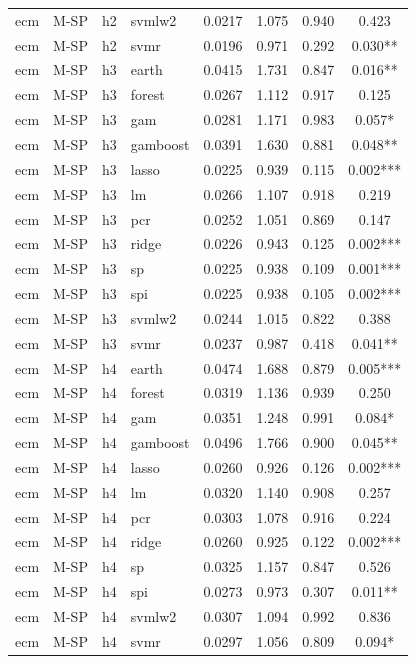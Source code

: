 \begin{ThreePartTable}
\begin{longtable}[t]{llclcccc}
ecm & M-SP & h2 & svmlw2 & 0.0217 & 1.075 & 0.940 & 0.423\\
ecm & M-SP & h2 & svmr & 0.0196 & 0.971 & 0.292 & 0.030**\\
\addlinespace
ecm & M-SP & h3 & earth & 0.0415 & 1.731 & 0.847 & 0.016**\\
ecm & M-SP & h3 & forest & 0.0267 & 1.112 & 0.917 & 0.125\\
ecm & M-SP & h3 & gam & 0.0281 & 1.171 & 0.983 & 0.057*\\
ecm & M-SP & h3 & gamboost & 0.0391 & 1.630 & 0.881 & 0.048**\\
ecm & M-SP & h3 & lasso & 0.0225 & 0.939 & 0.115 & 0.002***\\
ecm & M-SP & h3 & lm & 0.0266 & 1.107 & 0.918 & 0.219\\
ecm & M-SP & h3 & pcr & 0.0252 & 1.051 & 0.869 & 0.147\\
ecm & M-SP & h3 & ridge & 0.0226 & 0.943 & 0.125 & 0.002***\\
ecm & M-SP & h3 & sp & 0.0225 & 0.938 & 0.109 & 0.001***\\
ecm & M-SP & h3 & spi & 0.0225 & 0.938 & 0.105 & 0.002***\\
ecm & M-SP & h3 & svmlw2 & 0.0244 & 1.015 & 0.822 & 0.388\\
ecm & M-SP & h3 & svmr & 0.0237 & 0.987 & 0.418 & 0.041**\\
\addlinespace
ecm & M-SP & h4 & earth & 0.0474 & 1.688 & 0.879 & 0.005***\\
ecm & M-SP & h4 & forest & 0.0319 & 1.136 & 0.939 & 0.250\\
ecm & M-SP & h4 & gam & 0.0351 & 1.248 & 0.991 & 0.084*\\
ecm & M-SP & h4 & gamboost & 0.0496 & 1.766 & 0.900 & 0.045**\\
ecm & M-SP & h4 & lasso & 0.0260 & 0.926 & 0.126 & 0.002***\\
ecm & M-SP & h4 & lm & 0.0320 & 1.140 & 0.908 & 0.257\\
ecm & M-SP & h4 & pcr & 0.0303 & 1.078 & 0.916 & 0.224\\
ecm & M-SP & h4 & ridge & 0.0260 & 0.925 & 0.122 & 0.002***\\
ecm & M-SP & h4 & sp & 0.0325 & 1.157 & 0.847 & 0.526\\
ecm & M-SP & h4 & spi & 0.0273 & 0.973 & 0.307 & 0.011**\\
ecm & M-SP & h4 & svmlw2 & 0.0307 & 1.094 & 0.992 & 0.836\\
ecm & M-SP & h4 & svmr & 0.0297 & 1.056 & 0.809 & 0.094*\\

\end{longtable}
\end{ThreePartTable}
